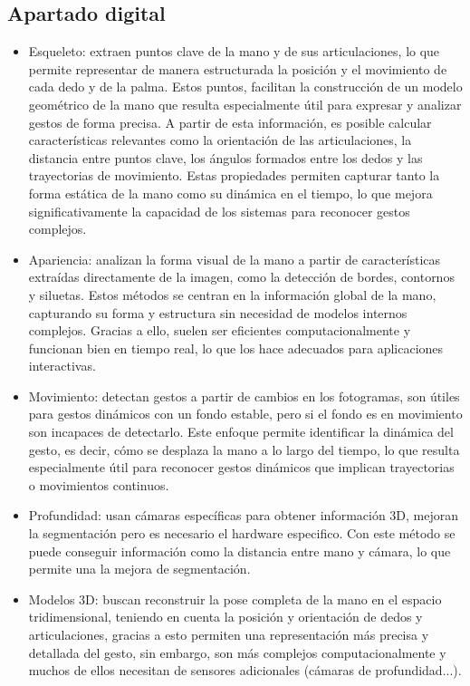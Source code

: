 \documentclass[10pt,a4paper,twocolumn,twoside]{article}
\begin{document}
\subsection{Apartado digital}
\begin{itemize}
\item	Esqueleto: extraen puntos clave de la mano y de sus articulaciones, lo que permite representar de manera estructurada la posición y el movimiento de cada dedo y de la palma. Estos puntos, facilitan la construcción de un modelo geométrico de la mano que resulta especialmente útil para expresar y analizar gestos de forma precisa. A partir de esta información, es posible calcular características relevantes como la orientación de las articulaciones, la distancia entre puntos clave, los ángulos formados entre los dedos y las trayectorias de movimiento. Estas propiedades permiten capturar tanto la forma estática de la mano como su dinámica en el tiempo, lo que mejora significativamente la capacidad de los sistemas para reconocer gestos complejos. 
\item	Apariencia: analizan la forma visual de la mano a partir de características extraídas directamente de la imagen, como la detección de bordes, contornos y siluetas. Estos métodos se centran en la información global de la mano, capturando su forma y estructura sin necesidad de modelos internos complejos. Gracias a ello, suelen ser eficientes computacionalmente y funcionan bien en tiempo real, lo que los hace adecuados para aplicaciones interactivas. 
\item	Movimiento: detectan gestos a partir de cambios en los fotogramas, son útiles para gestos dinámicos con un fondo estable, pero si el fondo es en movimiento son incapaces de detectarlo. Este enfoque permite identificar la dinámica del gesto, es decir, cómo se desplaza la mano a lo largo del tiempo, lo que resulta especialmente útil para reconocer gestos dinámicos que implican trayectorias o movimientos continuos. 
\item	Profundidad: usan cámaras específicas para obtener información 3D, mejoran la segmentación pero es necesario el hardware especifico. Con este método se puede conseguir información como la distancia entre mano y cámara, lo que permite una la mejora de segmentación. 
\item	Modelos 3D: buscan reconstruir la pose completa de la mano en el espacio tridimensional, teniendo en cuenta la posición y orientación de dedos y articulaciones, gracias a esto permiten una representación más precisa y detallada del gesto, sin embargo, son más complejos computacionalmente y muchos de ellos necesitan de sensores adicionales (cámaras de profundidad...). 
\end{itemize}
\end{document}
